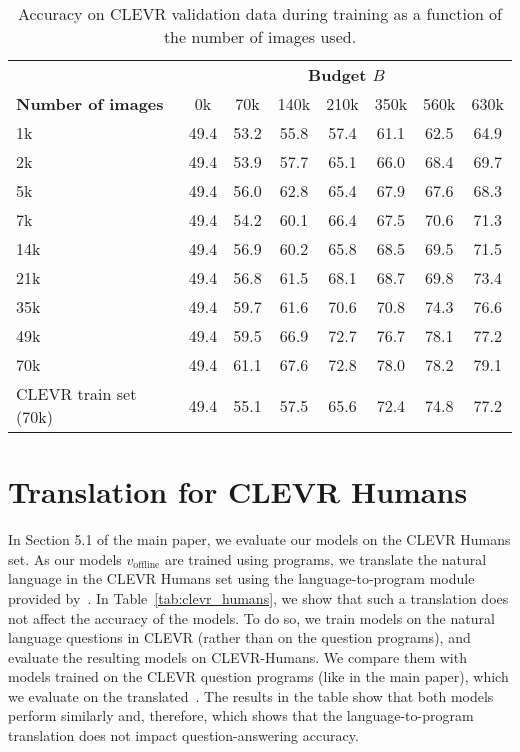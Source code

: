 \documentclass[10pt,twocolumn,letterpaper]{article}
\newcommand{\voffline}{v_{\mathrm{offline}}}
\begin{document}
\begin{table}[!t]
\setlength{\tabcolsep}{0.4em}
\centering
\footnotesize{
    \begin{tabular}{@{}l|ccccccc@{}}
     & \multicolumn{7}{c}{\textbf{Budget $B$}} \\
    \textbf{Number of images} & 0k & 70k & 140k & 210k & 350k & 560k & 630k \\
    \shline
    1k & 49.4 & 53.2 & 55.8 & 57.4 & 61.1 & 62.5 & 64.9 \\
    2k & 49.4 & 53.9 & 57.7 & 65.1 & 66.0 & 68.4 & 69.7 \\
    5k & 49.4 & 56.0 & 62.8 & 65.4 & 67.9 & 67.6 & 68.3 \\
    7k & 49.4 & 54.2 & 60.1 & 66.4 & 67.5 & 70.6 & 71.3 \\
    14k & 49.4 & 56.9 & 60.2 & 65.8 & 68.5 & 69.5 &  71.5\\
    21k & 49.4 & 56.8 & 61.5 & 68.1 & 68.7 & 69.8 & 73.4  \\
    35k & 49.4 & 59.7 & 61.6 & 70.6 & 70.8 & 74.3 & 76.6 \\
    49k & 49.4 & 59.5 & 66.9 & 72.7 & 76.7 & 78.1 & 77.2 \\
    70k & 49.4 & 61.1 & 67.6 & 72.8 & 78.0 & 78.2 & 79.1 \\
    \hline
    CLEVR train set (70k) & 49.4 & 55.1 & 57.5 & 65.6 & 72.4 & 74.8 & 77.2  \\
        \end{tabular}
\caption{Accuracy on CLEVR validation data during training as a function of the number of images used.}
\label{tab:vary_images}
}
\end{table}

\section{Translation for CLEVR Humans}
In Section 5.1 of the main paper, we evaluate our models on the CLEVR Humans set. As our models $\voffline$ are trained using programs, we translate the natural language in the CLEVR Humans set using the language-to-program module provided by~\cite{johnson17module}. In Table~\ref{tab:clevr_humans}, we show that such a translation does not affect the accuracy of the models. To do so, we train models on the natural language questions in CLEVR (rather than on the question programs), and evaluate the resulting models on CLEVR-Humans. We compare them with models trained on the CLEVR question programs (like in the main paper), which we evaluate on the translated~\cite{johnson17module}. The results in the table show that both models perform similarly and, therefore, which shows that the language-to-program translation does not impact question-answering accuracy.
\end{document}
